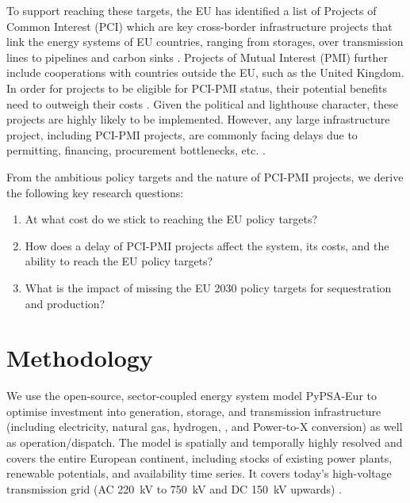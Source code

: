 \documentclass[10pt]{article}
\let\autocite\cite
\begin{document}
To support reaching these targets, the EU has identified a list of Projects of Common Interest (PCI) which are key cross-border infrastructure projects that link the energy systems of EU countries, ranging from storages, over transmission lines to pipelines and carbon sinks \autocite{europeancommissionCommissionDelegatedRegulation2023}. Projects of Mutual Interest (PMI) further include cooperations with countries outside the EU, such as the United Kingdom. In order for projects to be eligible for PCI-PMI status, their potential benefits need to outweigh their costs \autocite{europeancommissionCommissionDelegatedRegulation2023}. Given the political and lighthouse character, these projects are highly likely to be implemented. However, any large infrastructure project, including PCI-PMI projects, are commonly facing delays due to permitting, financing, procurement bottlenecks, etc. \autocite{acerConsolidatedReportProgress2023}.

From the ambitious policy targets and the nature of PCI-PMI projects, we derive the following key research questions:

\begin{enumerate}
    \item At what cost do we stick to reaching the EU policy targets?
    \item How does a delay of PCI-PMI projects affect the system, its costs, and the ability to reach the EU policy targets?
    \item What is the impact of missing the EU 2030 policy targets for  sequestration and  production?
 \end{enumerate}

\section*{Methodology}

We use the open-source, sector-coupled energy system model PyPSA-Eur \autocite{horschPyPSAEurOpenOptimisation2018} to optimise investment into generation, storage, and transmission infrastructure (including electricity, natural gas, hydrogen, , and Power-to-X conversion) as well as operation/dispatch. The model is spatially and temporally highly resolved and covers the entire European continent, including stocks of existing power plants, renewable potentials, and availability time series. It covers today's high-voltage transmission grid (AC \SI{220}{kV} to \SI{750}{kV} and DC \SI{150}{kV} upwards) \autocite{xiongModellingHighVoltageGrid2024}.
\end{document}
